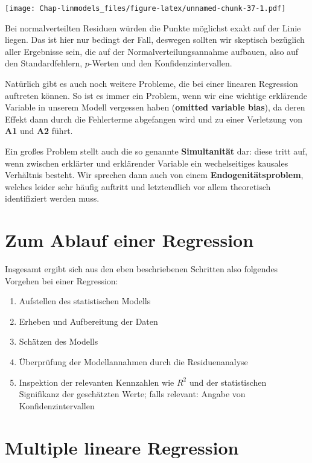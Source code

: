 \documentclass[]{book}
\begin{document}
\texttt{[image: Chap-linmodels\_files/figure-latex/unnamed-chunk-37-1.pdf]}

Bei normalverteilten Residuen würden die Punkte möglichst exakt auf der
Linie liegen. Das ist hier nur bedingt der Fall, deswegen sollten wir
skeptisch bezüglich aller Ergebnisse sein, die auf der
Normalverteilungsannahme aufbauen, also auf den Standardfehlern,
\(p\)-Werten und den Konfidenzintervallen.

Natürlich gibt es auch noch weitere Probleme, die bei einer linearen
Regression auftreten können. So ist es immer ein Problem, wenn wir eine
wichtige erklärende Variable in unserem Modell vergessen haben
(\textbf{omitted variable bias}), da deren Effekt dann durch die
Fehlerterme abgefangen wird und zu einer Verletzung von \textbf{A1} und
\textbf{A2} führt.

Ein großes Problem stellt auch die so genannte \textbf{Simultanität}
dar: diese tritt auf, wenn zwischen erklärter und erklärender Variable
ein wechelseitiges kausales Verhältnis besteht. Wir sprechen dann auch
von einem \textbf{Endogenitätsproblem}, welches leider sehr häufig
auftritt und letztendlich vor allem theoretisch identifiziert werden
muss.

\hypertarget{stat-ablauf}{\section{Zum Ablauf einer
Regression}\label{stat-ablauf}}

Insgesamt ergibt sich aus den eben beschriebenen Schritten also
folgendes Vorgehen bei einer Regression:

\begin{enumerate}
\def\labelenumi{\arabic{enumi}.}
\item
  Aufstellen des statistischen Modells
\item
  Erheben und Aufbereitung der Daten
\item
  Schätzen des Modells
\item
  Überprüfung der Modellannahmen durch die Residuenanalyse
\item
  Inspektion der relevanten Kennzahlen wie \(R^2\) und der statistischen
  Signifikanz der geschätzten Werte; falls relevant: Angabe von
  Konfidenzintervallen
\end{enumerate}

\hypertarget{lin-multi}{\section{Multiple lineare
Regression}\label{lin-multi}}
\end{document}
